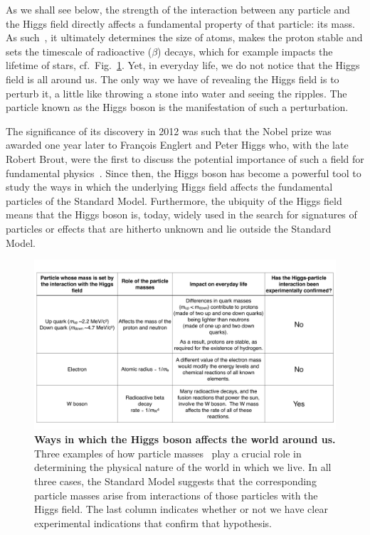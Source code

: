 \documentclass[12pt]{article}
\begin{document}
As we shall see below, the strength of the interaction between any
particle and the Higgs field directly affects a fundamental property
of that particle: its mass.
As such~\cite{Quigg:2009xr},
it ultimately determines the size of atoms, makes the proton stable
and sets the timescale of radioactive ($\beta$) decays, which for example
impacts the lifetime of stars, cf.\ Fig.~\ref{fig:mass-impact}.
%
Yet, in everyday life, we do not notice that the Higgs field is
all around us.
%
The only way we have of revealing the Higgs field is to perturb it, a
little like throwing a stone into water and seeing the ripples.
%
The particle known as the Higgs boson is the manifestation of such a
perturbation. 

The significance of its discovery in 2012 
%
was such that 
%
the Nobel prize was awarded one year later to François Englert
and Peter Higgs who, with the late Robert Brout, were the first to
discuss the potential importance of such a field for fundamental
physics~\cite{Englert:1964et,Higgs:1964ia,Higgs:1964pj}.
%
Since then, the Higgs boson has become a powerful tool to study the
ways in which the underlying Higgs field affects the fundamental
particles of the Standard Model.
%
Furthermore, the ubiquity of the Higgs field means that the Higgs
boson is, today, widely used in the search for signatures of particles or
effects that are hitherto unknown and lie outside the Standard Model.


%
\begin{figure}[t]
  \centering
   \includegraphics[width=\textwidth,page=1]{figs/Fig1-final.pdf}
  \caption{{\bf Ways in which the Higgs boson affects the world around us.}
    Three examples of how particle masses~\cite{ParticleDataGroup:2020ssz} play a crucial role in determining
    the physical nature of the world in which we live.
    In all three cases, the Standard Model suggests that the
    corresponding particle
    masses arise from interactions of those particles with the Higgs
    field. 
    The last column indicates whether or not we have clear
    experimental indications that confirm that hypothesis.
  }  
  \label{fig:mass-impact}
\end{figure}
\end{document}
